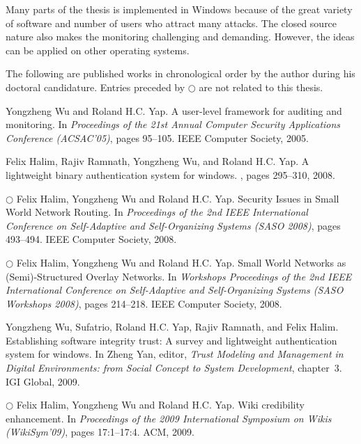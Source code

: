 Many parts of the thesis is implemented in Windows because of the great
variety of software and number of users who attract many attacks.
The closed source nature also makes the monitoring challenging and
demanding.
However, the ideas can be applied on other operating systems.

The following are published works in chronological order
by the author during his doctoral candidature.
Entries preceded by $\bigcirc$ are not related to this thesis.

\begin{tightenumerate}
\item
Yongzheng Wu and Roland H.C. Yap.
\newblock A user-level framework for auditing and monitoring.
\newblock In {\em Proceedings of the 21st Annual Computer Security Applications
  Conference (ACSAC'05)}, pages 95--105. IEEE Computer Society, 2005.

\item
Felix Halim, Rajiv Ramnath, Yongzheng Wu, and Roland H.C. Yap.
\newblock A lightweight binary authentication system for windows.
, pages 295--310, 2008.

\item $\bigcirc$
Felix Halim, Yongzheng Wu and Roland H.C. Yap.
\newblock Security Issues in Small World Network Routing.
\newblock In {\em Proceedings of the 2nd IEEE International Conference on
  Self-Adaptive and Self-Organizing Systems (SASO 2008)},
  pages 493--494. IEEE Computer Society, 2008.

\item $\bigcirc$
Felix Halim, Yongzheng Wu and Roland H.C. Yap.
\newblock Small World Networks as (Semi)-Structured Overlay Networks.
\newblock In {\em Workshops Proceedings of the 2nd IEEE International
  Conference on Self-Adaptive and Self-Organizing Systems
  (SASO Workshops 2008)},
  pages 214--218. IEEE Computer Society, 2008.

\item
Yongzheng Wu, Sufatrio, Roland H.C. Yap, Rajiv Ramnath, and Felix Halim.
\newblock Establishing software integrity trust: A survey and lightweight
  authentication system for windows.
\newblock In Zheng Yan, editor, {\em Trust Modeling and Management in Digital
  Environments: from Social Concept to System Development}, chapter~3. IGI
  Global, 2009.

\item $\bigcirc$
Felix Halim, Yongzheng Wu and Roland H.C. Yap.
\newblock Wiki credibility enhancement.
\newblock In {\em Proceedings of the 2009 International Symposium on Wikis (WikiSym'09)},
  pages 17:1--17:4. ACM, 2009.


\end{tightenumerate}
